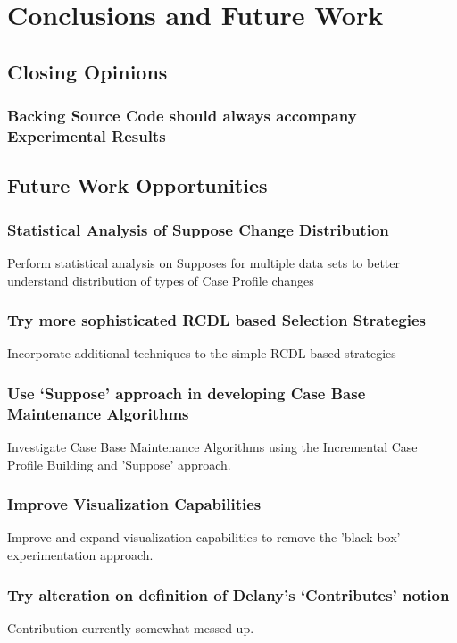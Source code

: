 \documentclass[a4paper,11pt]{report}
\begin{document}
\chapter{Conclusions and Future Work\label{cha:conclusions}}

\section{Closing Opinions}
\subsection{Backing Source Code should always accompany Experimental Results}

\section{Future Work Opportunities}
\subsection{Statistical Analysis of Suppose Change Distribution}
Perform statistical analysis on Supposes for multiple data sets to better understand distribution of types of Case Profile changes

\subsection{Try more sophisticated RCDL based Selection Strategies}
Incorporate additional techniques to the simple RCDL based strategies

\subsection{Use `Suppose' approach in developing Case Base Maintenance Algorithms}
Investigate Case Base Maintenance Algorithms using the Incremental Case Profile Building and 'Suppose' approach.

\subsection{Improve Visualization Capabilities}
Improve and expand visualization capabilities to remove the 'black-box' experimentation approach.

\subsection{Try alteration on definition of Delany's `Contributes' notion}
Contribution currently somewhat messed up.
\end{document}
